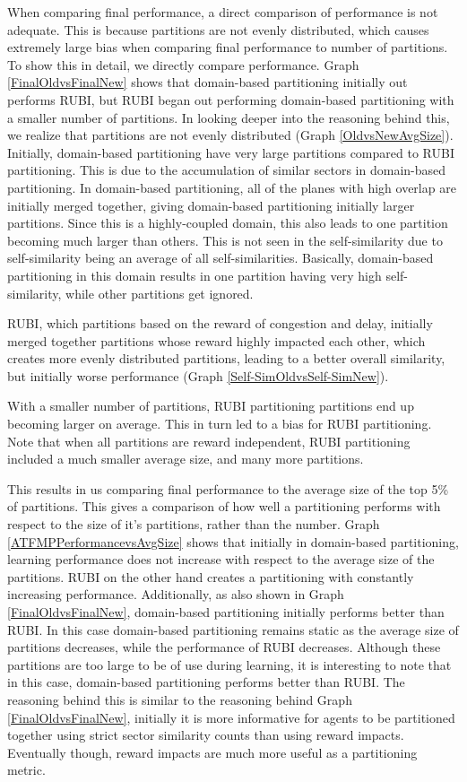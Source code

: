 \documentclass[onehalf,11pt]{beavtex}
\begin{document}
When comparing final performance, a direct comparison of performance is not adequate. This is because partitions are not evenly distributed, which causes extremely large bias when comparing final performance to number of partitions. To show this in detail, we directly compare performance. Graph \ref{FinalOldvsFinalNew} shows that domain-based partitioning initially out performs RUBI, but RUBI began out performing domain-based partitioning with a smaller number of partitions. In looking deeper into the reasoning behind this, we realize that partitions are not evenly distributed (Graph \ref{OldvsNewAvgSize}). Initially, domain-based partitioning have very large partitions compared to RUBI partitioning. This is due to the accumulation of similar sectors in domain-based partitioning. In domain-based partitioning, all of the planes with high overlap are initially merged together, giving domain-based partitioning initially larger partitions. Since this is a highly-coupled domain, this also leads to one partition becoming much larger than others. This is not seen in the self-similarity due to self-similarity being an average of all self-similarities. Basically, domain-based partitioning in this domain results in one partition having very high self-similarity, while other partitions get ignored. 

RUBI, which partitions based on the reward of congestion and delay, initially merged together partitions whose reward highly impacted each other, which creates more evenly distributed partitions, leading to a better overall similarity, but initially worse performance (Graph \ref{Self-SimOldvsSelf-SimNew}).

With a smaller number of partitions, RUBI partitioning partitions end up becoming larger on average. This in turn led to a bias for RUBI partitioning. Note that when all partitions are reward independent, RUBI partitioning included a much smaller average size, and many more partitions.

This results in us comparing final performance to the average size of the top 5\% of partitions. This gives a comparison of how well a partitioning performs with respect to the size of it's partitions, rather than the number. Graph \ref{ATFMPPerformancevsAvgSize} shows that initially in domain-based partitioning, learning performance does not increase with respect to the average size of the partitions. RUBI on the other hand creates a partitioning with constantly increasing performance. Additionally, as also shown in Graph \ref{FinalOldvsFinalNew}, domain-based partitioning initially performs better than RUBI. In this case domain-based partitioning remains static as the average size of partitions decreases, while the performance of RUBI decreases. Although these partitions are too large to be of use during learning, it is interesting to note that in this case, domain-based partitioning performs better than RUBI. The reasoning behind this is similar to the reasoning behind Graph \ref{FinalOldvsFinalNew}, initially it is more informative for agents to be partitioned together using strict sector similarity counts than using reward impacts. Eventually though, reward impacts are much more useful as a partitioning metric.
\end{document}
